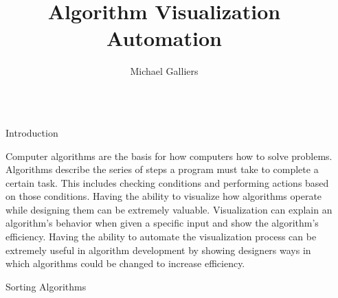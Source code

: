 \documentclass[final]{beamer}
\title{Algorithm Visualization Automation} %
\author{Michael Galliers} %
\institute{Eastern Kentucky University - Department of Computer Science} %
\newlength{\sepwid}
\newlength{\onecolwid}
\begin{document}

\setlength{\belowcaptionskip}{2ex} %
\setlength\belowdisplayshortskip{2ex} %

\begin{frame}[t] %

\begin{columns}[t]

\begin{column}{\sepwid}\end{column} %

\begin{column}{\onecolwid} %


\begin{block}{Introduction}

Computer algorithms are the basis for how computers how to solve problems. Algorithms describe the
series of steps a program must take to complete a certain task. This includes checking conditions
and performing actions based on those conditions. Having the ability to visualize how algorithms
operate while designing them can be extremely valuable. Visualization can explain an algorithm's
behavior when given a specific input and show the algorithm’s efficiency. Having the ability to
automate the visualization process can be extremely useful in algorithm development by showing
designers ways in which algorithms could be changed to increase efficiency.

\end{block}


\begin{block}{Sorting Algorithms}


\end{block}
\end{column}
\end{columns}
\end{frame}
\end{document}
